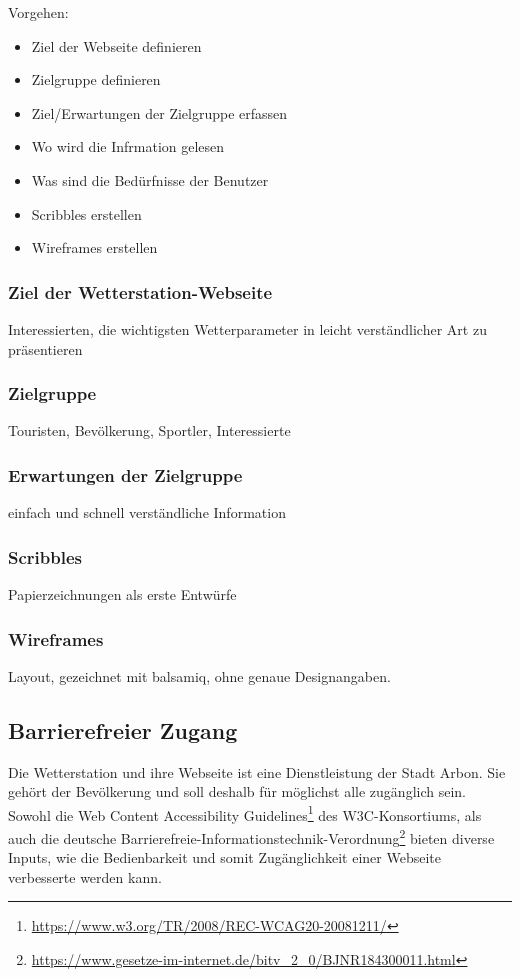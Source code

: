 Vorgehen:

\begin{itemize}
\item Ziel der Webseite definieren
\item Zielgruppe definieren
\item Ziel/Erwartungen der Zielgruppe erfassen
\item Wo wird die Infrmation gelesen
\item Was sind die Bedürfnisse der Benutzer
\item Scribbles erstellen
\item Wireframes erstellen
\end{itemize}

\subsubsection*{Ziel der Wetterstation-Webseite}
Interessierten, die wichtigsten Wetterparameter in leicht verständlicher Art zu präsentieren
\subsubsection*{Zielgruppe}
Touristen, Bevölkerung, Sportler, Interessierte
\subsubsection*{Erwartungen der Zielgruppe}
einfach und schnell verständliche Information
\subsubsection*{Scribbles}
Papierzeichnungen als erste Entwürfe
\subsubsection*{Wireframes}
Layout, gezeichnet mit balsamiq, ohne genaue Designangaben.




\subsection{Barrierefreier Zugang}
Die Wetterstation und ihre Webseite ist eine Dienstleistung der Stadt Arbon. Sie gehört der Bevölkerung und soll deshalb für möglichst alle zugänglich sein. Sowohl die \flqq Web Content Accessibility Guidelines\frqq\footnote{ \url{https://www.w3.org/TR/2008/REC-WCAG20-20081211/}} des W3C-Konsortiums, als auch die deutsche \flqq  Barrierefreie-Informationstechnik-Verordnung\frqq\footnote{ \url{https://www.gesetze-im-internet.de/bitv_2_0/BJNR184300011.html}} bieten diverse Inputs, wie die Bedienbarkeit und somit Zugänglichkeit einer Webseite verbesserte werden kann. 
\newline

